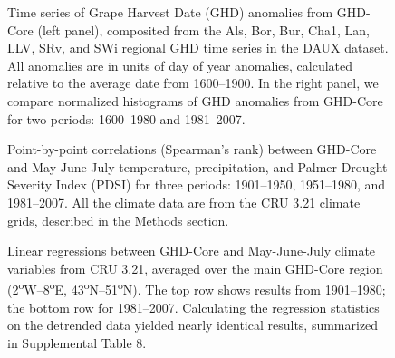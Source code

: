 \documentclass[final]{nature}
\begin{document}

\begin{figure}
\caption{Time series of Grape Harvest Date (GHD) anomalies from GHD-Core (left panel), composited from the Als, Bor, Bur, Cha1, Lan, LLV, SRv, and SWi regional GHD time series in the DAUX dataset. All anomalies are in units of day of year anomalies, calculated  relative to the average date from 1600--1900. In the right panel, we compare normalized histograms of GHD anomalies from GHD-Core for two periods: 1600--1980 and 1981--2007.}
\end{figure}

\begin{figure}
\caption{Point-by-point correlations (Spearman's rank) between GHD-Core and May-June-July temperature, precipitation, and Palmer Drought Severity Index (PDSI) for three periods: 1901--1950, 1951--1980, and 1981--2007. All the climate data are from the CRU 3.21 climate grids, described in the Methods section.}
\end{figure}

\begin{figure}
\caption{Linear regressions between GHD-Core and May-June-July climate variables from CRU 3.21, averaged over the main GHD-Core region (2\textsuperscript{o}W--8\textsuperscript{o}E, 43\textsuperscript{o}N--51\textsuperscript{o}N). The top row shows results from 1901--1980; the bottom row for 1981--2007. Calculating the regression statistics on the detrended data yielded nearly identical results, summarized in Supplemental Table 8.}
\end{figure}
\end{document}
